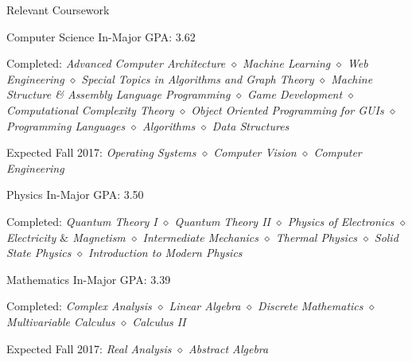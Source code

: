 \documentclass{resume}
\newcommand{\coursep}{\diamond}
\begin{document}
  \begin{rSection}{Relevant Coursework}
    \begin{rSubsection}{Computer Science}
        {In-Major GPA: 3.62}{}{}
        \item Completed: \textit{Advanced Computer Architecture $\coursep$ Machine Learning $\coursep$ Web Engineering $\coursep$ Special Topics in Algorithms and Graph Theory $\coursep$ Machine Structure \& Assembly Language Programming $\coursep$ Game Development $\coursep$ Computational Complexity Theory $\coursep$ Object Oriented Programming for GUIs $\coursep$ Programming Languages $\coursep$ Algorithms $\coursep$ Data Structures}
        \item Expected Fall 2017: \textit{Operating Systems $\coursep$ Computer Vision $\coursep$ Computer Engineering} 
    \end{rSubsection}
    \begin{rSubsection}{Physics}
        {In-Major GPA: 3.50}{}{}
        \item Completed: \textit{Quantum Theory I $\coursep$ Quantum Theory II $\coursep$ Physics of Electronics $\coursep$ Electricity $\&$ Magnetism $\coursep$ Intermediate Mechanics $\coursep$ Thermal Physics $\coursep$ Solid State Physics $\coursep$ Introduction to Modern Physics}
    \end{rSubsection}
    \begin{rSubsection}{Mathematics}
        {In-Major GPA: 3.39}{}{}
        \item Completed: \textit{Complex Analysis $\coursep$ Linear Algebra $\coursep$ Discrete Mathematics $\coursep$ Multivariable Calculus $\coursep$ Calculus II}
        \item Expected Fall 2017: \textit{Real Analysis $\coursep$ Abstract Algebra} 
    \end{rSubsection}
  \end{rSection}
\end{document}
